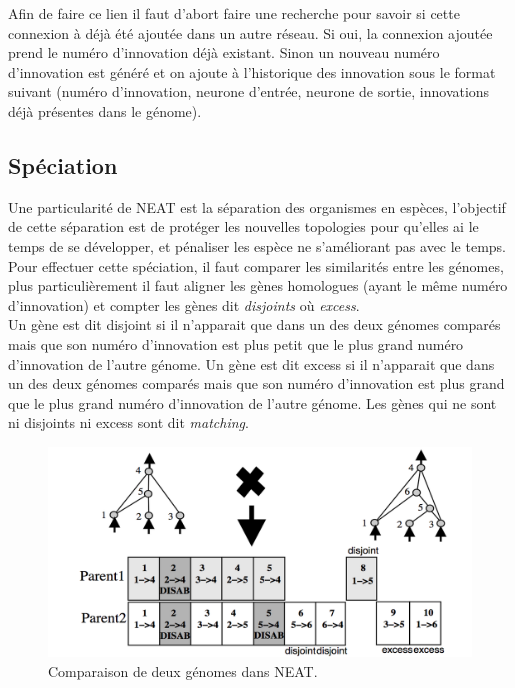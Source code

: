 \documentclass{article}
\begin{document}
Afin de faire ce lien il faut d'abort faire une recherche pour savoir si cette connexion à déjà été ajoutée dans un autre réseau. Si oui, la connexion ajoutée prend le numéro d'innovation déjà existant. Sinon un nouveau numéro d'innovation est généré et on ajoute à l'historique des innovation sous le format suivant (numéro d'innovation, neurone d'entrée, neurone de sortie, innovations déjà présentes dans le génome).\\

\subsection{Spéciation}

Une particularité de NEAT est la séparation des organismes en espèces, l'objectif de cette séparation est de protéger les nouvelles topologies pour qu'elles ai le temps de se développer, et pénaliser les espèce ne s'améliorant pas avec le temps.\\ 

Pour effectuer cette spéciation, il faut comparer les similarités entre les génomes, plus particulièrement il faut aligner les gènes homologues (ayant le même numéro d'innovation) et compter les gènes dit \textit{disjoints} où \textit{excess}.\\
Un gène est dit disjoint si il n'apparait que dans un des deux génomes comparés mais que son numéro d'innovation est plus petit que le plus grand numéro d'innovation de l'autre génome. Un gène est dit excess si il n'apparait que dans un des deux génomes comparés mais que son numéro d'innovation est plus grand que le plus grand numéro d'innovation de l'autre génome. Les gènes qui ne sont ni disjoints ni excess sont dit \textit{matching}.

\begin{figure}[H]
\begin{center}
	\includegraphics[scale=0.4]{disjointexcess.png}
	\caption{Comparaison de deux génomes dans NEAT.\cite{neatpaper}}
\end{center}
\end{figure}
\end{document}
